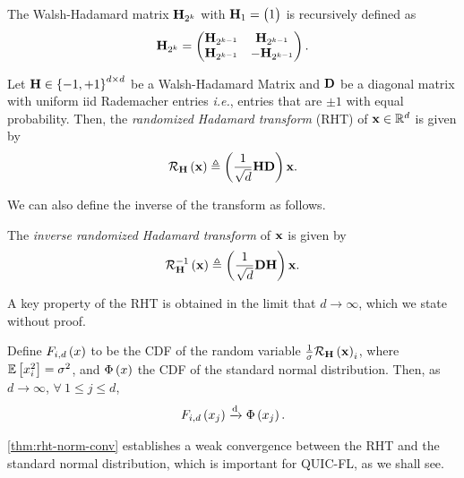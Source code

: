 \documentclass[journal,12pt,twocolumn]{IEEEtran}
\begin{document}
\begin{definition}
    \label{def:wh-matrix}
    The Walsh-Hadamard matrix \(\boldsymbol{\mathbf{H}}_{2^k}\) with \(\boldsymbol{\mathbf{H}}_1 = 
    \begin{pmatrix}1\end{pmatrix}\) is recursively defined as
    \begin{equation}
        \boldsymbol{\mathbf{H}}_{2^k} = \begin{pmatrix}\boldsymbol{\mathbf{H}}_{2^{k-1}} & \boldsymbol{\mathbf{H}}_{2^{k-1}} \\ \boldsymbol{\mathbf{H}}_{2^{k-1}} & -\boldsymbol{\mathbf{H}}_{2^{k-1}}\end{pmatrix}.
        \label{eq:Hl-def}
    \end{equation}
\end{definition}
\begin{definition}
    \label{def:rht}
    Let \(\boldsymbol{\mathbf{H}}\in\left\{-1,+1\right\}^{d\times d}\) be a Walsh-Hadamard 
    Matrix and \(\boldsymbol{\mathbf{D}}\) be a diagonal matrix with uniform iid 
    Rademacher entries \emph{i.e.}, entries that are \(\pm 1\) with 
    equal probability. Then, the \emph{randomized Hadamard transform} 
    (RHT) of \(\boldsymbol{\mathbf{x}}\in\mathbb R^d\) is given by
    \begin{equation}
        \mathcal R_{\boldsymbol{\mathbf{H}}}\left(\boldsymbol{\mathbf{x}}\right) \triangleq \left(\frac{1}{\sqrt{d}}\boldsymbol{\mathbf{HD}}\right)\boldsymbol{\mathbf{x}}.
        \label{eq:rht-def}
    \end{equation}
\end{definition}
We can also define the inverse of the transform as follows.
\begin{definition}
    The \emph{inverse randomized Hadamard transform} of \(\boldsymbol{\mathbf{x}}\) is
    given by
    \begin{equation}
        \mathcal R_{\boldsymbol{\mathbf{H}}}^{-1}\left(\boldsymbol{\mathbf{x}}\right) \triangleq \left(\frac{1}{\sqrt{d}}\boldsymbol{\mathbf{DH}}\right)\boldsymbol{\mathbf{x}}.
        \label{eq:inv-rht-def}
    \end{equation}
\end{definition}
A key property of the RHT is obtained in the limit that \(d\to\infty\),
which we state without proof.
\begin{theorem}
    \label{thm:rht-norm-conv}
    Define \(F_{i,d}\left(x\right)\) to be the CDF of the random variable
    \(\frac{1}{\sigma}\mathcal R_{\boldsymbol{\mathbf{H}}}\left(\boldsymbol{\mathbf{x}}\right)_i\), where
    \(\mathbb{E}\left[ x_i^2 \right] = \sigma^2\), and \(\Phi\left(x\right)\) the CDF of the
    standard normal distribution. Then, as \(d\to\infty\), \(\forall\ 1 \le
    j \le d\), 
    \begin{equation}
        F_{i,d}\left(x_j\right) \xrightarrow{\mathrm{d}} \Phi\left(x_j\right).
        \label{eq:rht-norm-conv}
    \end{equation}
\end{theorem}
\autoref{thm:rht-norm-conv} establishes a weak convergence between the RHT
and the standard normal distribution, which is important for QUIC-FL, as we
shall see.
\end{document}
